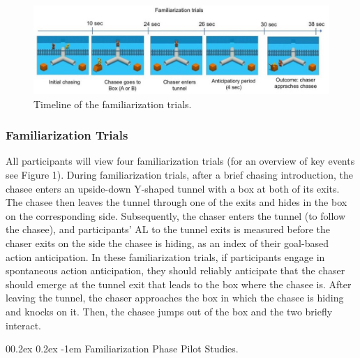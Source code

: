 \documentclass[
  english,
  man,floatsintext]{apa6}
\makeatletter
\let\oldparagraph\paragraph
\renewcommand{\paragraph}[1]{\oldparagraph{#1}\mbox{}}
\renewcommand{\paragraph}{\@startsection{paragraph}{4}{\parindent}%
  {0\baselineskip \@plus 0.2ex \@minus 0.2ex}%
  {-1em}%
  {\normalfont\normalsize\bfseries\itshape\typesectitle}}
\makeatother
\begin{document}
\begin{figure}

{\centering \includegraphics[width=6.8in]{Figure1} 

}

\caption{Timeline of the familiarization trials.}\label{fig:fig1}
\end{figure}

\hypertarget{familiarization-trials}{%
\subsubsection{Familiarization Trials}\label{familiarization-trials}}

All participants will view four familiarization trials (for an overview of key events see Figure 1). During familiarization trials, after a brief chasing introduction, the chasee enters an upside-down Y-shaped tunnel with a box at both of its exits. The chasee then leaves the tunnel through one of the exits and hides in the box on the corresponding side. Subsequently, the chaser enters the tunnel (to follow the chasee), and participants' AL to the tunnel exits is measured before the chaser exits on the side the chasee is hiding, as an index of their goal-based action anticipation. In these familiarization trials, if participants engage in spontaneous action anticipation, they should reliably anticipate that the chaser should emerge at the tunnel exit that leads to the box where the chasee is. After leaving the tunnel, the chaser approaches the box in which the chasee is hiding and knocks on it. Then, the chasee jumps out of the box and the two briefly interact.

\hypertarget{familiarization-phase-pilot-studies.}{%
\paragraph{Familiarization Phase Pilot Studies.}\label{familiarization-phase-pilot-studies.}}
\end{document}
